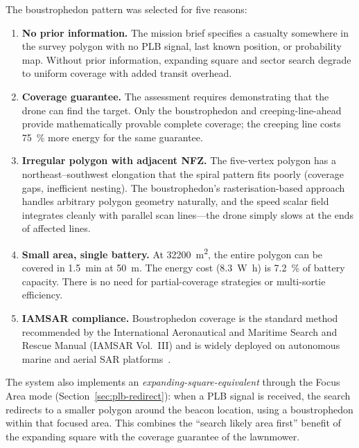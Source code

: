 The boustrophedon pattern was selected for five reasons:

\begin{enumerate}
  \item \textbf{No prior information.} The mission brief specifies a casualty somewhere in the survey polygon with no PLB signal, last known position, or probability map.
        Without prior information, expanding square and sector search degrade to uniform coverage with added transit overhead.

  \item \textbf{Coverage guarantee.} The assessment requires demonstrating that the drone can find the target.
        Only the boustrophedon and creeping-line-ahead provide mathematically provable complete coverage; the creeping line costs \SI{75}{\percent} more energy for the same guarantee.

  \item \textbf{Irregular polygon with adjacent NFZ.} The five-vertex polygon has a northeast--southwest elongation that the spiral pattern fits poorly (coverage gaps, inefficient nesting).
        The boustrophedon's rasterisation-based approach handles arbitrary polygon geometry naturally, and the speed scalar field integrates cleanly with parallel scan lines---the drone simply slows at the ends of affected lines.

  \item \textbf{Small area, single battery.} At \SI{32200}{\metre\squared}, the entire polygon can be covered in \SI{1.5}{\minute} at \SI{50}{\metre}.
        The energy cost (\SI{8.3}{\watt\hour}) is \SI{7.2}{\percent} of battery capacity.
        There is no need for partial-coverage strategies or multi-sortie efficiency.

  \item \textbf{IAMSAR compliance.} Boustrophedon coverage is the standard method recommended by the International Aeronautical and Maritime Search and Rescue Manual (IAMSAR Vol.~III) and is widely deployed on autonomous marine and aerial SAR platforms~\cite{galceran2013survey}.
\end{enumerate}

\noindent The system also implements an \emph{expanding-square-equivalent} through the Focus Area mode (Section~\ref{sec:plb-redirect}): when a PLB signal is received, the search redirects to a smaller polygon around the beacon location, using a boustrophedon within that focused area.
This combines the ``search likely area first'' benefit of the expanding square with the coverage guarantee of the lawnmower.

